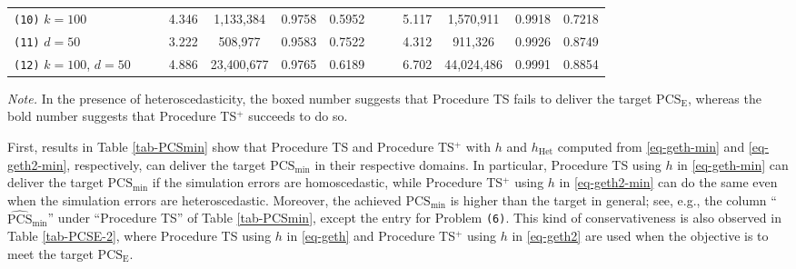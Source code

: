 \documentclass[ijoc,nonblindrev]{informs3}
\def\PCSE{\mathrm{PCS}_{\mathrm{E}}}
\def\hhet{h_{\mathrm{Het}}}
\def\PCSmin{\mathrm{PCS}_{\mathrm{min}}}
\def\APCSmin{\widehat{\mathrm{PCS}}_{\mathrm{min}}}
\begin{document}
\begin{table}[!b]
{\begin{tabular}{lcccccccccccc}
    \cmidrule{1-13}

    \texttt{(10)} $k=100$ & &             & 4.346 & \phantom{0}1,133,384 & 0.9758 & 0.5952 & &            & 5.117 & \phantom{0}1,570,911           & 0.9918 & 0.7218 \\
    \texttt{(11)} $d=50$ & &              & 3.222 & \phantom{00,}508,977 & 0.9583 & 0.7522 & &            & 4.312 & \phantom{00,}911,326           & 0.9926 & 0.8749\\
    \texttt{(12)} $k=100$, $d=50$ & &     & 4.886 & 23,400,677 & 0.9765 & 0.6189 & &            & 6.702 & 44,024,486           & 0.9991 & 0.8854\\
    \bottomrule
    \end{tabular}
\begin{minipage}[t]{1\linewidth}
\SingleSpacedXI
\vspace{0.6em}
\footnotesize{
\emph{Note.} \textsf{In the presence of heteroscedasticity, the boxed number suggests that Procedure TS fails to deliver the target $\PCSE$, whereas the bold number suggests that Procedure TS$^+$ succeeds to do so.}
}
\end{minipage}
}
\end{table}%



First, results in Table \ref{tab-PCSmin} show that Procedure TS and Procedure TS$^+$ with $h$ and $\hhet$ computed from \eqref{eq-geth-min} and \eqref{eq-geth2-min}, respectively,
can deliver the target $\PCSmin$ in their respective domains.
In particular,
Procedure TS using $h$ in \eqref{eq-geth-min} can deliver the target $\PCSmin$ if the simulation errors are homoscedastic,
while Procedure TS$^+$ using $h$ in \eqref{eq-geth2-min} can do the same even when the simulation errors are heteroscedastic.
Moreover, the achieved $\PCSmin$ is higher than the target in general; see, e.g., the column ``$\APCSmin$'' under ``Procedure TS'' of Table \ref{tab-PCSmin}, except the entry for Problem \texttt{(6)}.
This kind of conservativeness is also observed in Table \ref{tab-PCSE-2},
where Procedure TS using $h$ in \eqref{eq-geth} and Procedure TS$^+$ using $h$ in \eqref{eq-geth2} are used when the objective is to meet the target $\PCSE$.
\end{document}
